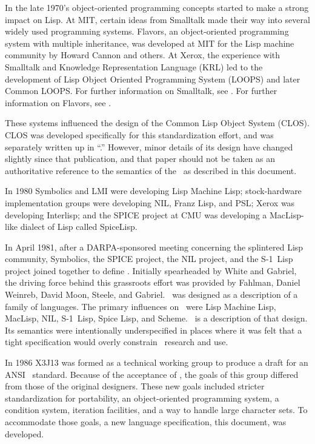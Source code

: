 In the late 1970's object-oriented programming concepts started to
make a strong impact on Lisp. 
At MIT, certain ideas from Smalltalk made their way into several
widely used programming systems.
Flavors, an object-oriented programming system with multiple inheritance, 
was developed at MIT for the Lisp machine community by Howard Cannon and others.
At Xerox, the experience with Smalltalk and 
Knowledge Representation Language (KRL) led to the development of 
Lisp Object Oriented Programming System (LOOPS) and later Common LOOPS.
For further information on Smalltalk, see {\SmalltalkBook}.
For further information on Flavors, see {\FlavorsPaper}.

These systems influenced the design of the Common Lisp Object System (CLOS).
CLOS was developed specifically for this standardization effort,
and was separately written up in ``\CLOSPaper.''  However, minor details
of its design have changed slightly since that publication, and that paper 
should not be taken as an authoritative reference to the semantics of the
\CLOS\ as described in this document.

In 1980 Symbolics and LMI were developing Lisp Machine Lisp; stock-hardware
implementation groups were developing NIL, Franz Lisp, and PSL; Xerox
was developing Interlisp; and the SPICE project at CMU was developing
a MacLisp-like dialect of Lisp called SpiceLisp.
 
In April 1981, after a DARPA-sponsored meeting concerning the
splintered Lisp community, Symbolics, the SPICE project, the NIL
project, and the \hbox{S-1}~Lisp project joined together to define
\clisp.  Initially spearheaded by White and Gabriel, the
driving force behind this grassroots effort was provided by Fahlman,
Daniel Weinreb, David Moon, Steele,  and Gabriel.
\clisp\ was designed as a description of a family of languages.  The
primary influences on \clisp\ were Lisp Machine Lisp, MacLisp, NIL,
\hbox{S-1}~Lisp, Spice Lisp, and Scheme.
\CLtL\ is a description of that design.  Its
semantics were intentionally underspecified in places where it was
felt that a tight specification would overly constrain \clisp\
research and use.

In 1986 X3J13 was formed as a technical working group to
produce a draft for an ANSI \clisp\ standard. Because of the
acceptance of \clisp, the goals of this group differed from those of
the original designers. These new goals included stricter
standardization for portability, an object-oriented programming
system, a condition system, iteration facilities, and a way to handle
large character sets.  To accommodate those
goals, a new language specification, this
document, was developed.
 
\endsubSection%

